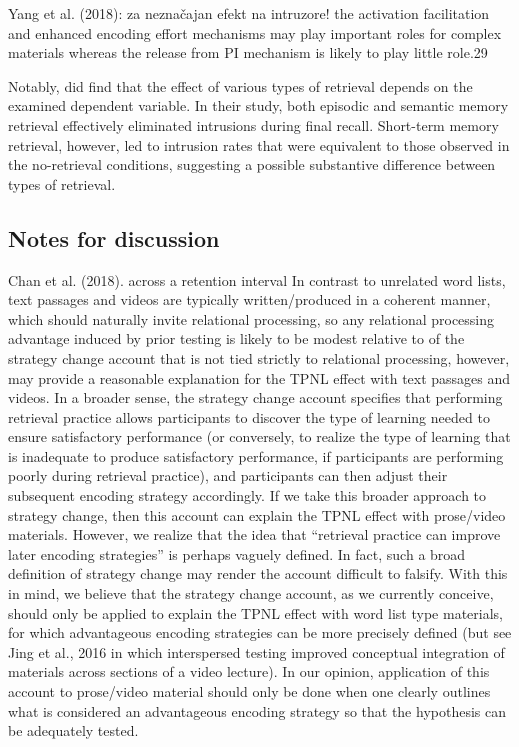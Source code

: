 \documentclass[../main.tex]{subfiles}
\begin{document}
Yang et al. (2018): za neznačajan efekt na intruzore!
the activation facilitation and enhanced encoding effort mechanisms may play
important roles for complex materials whereas the release from PI
mechanism is likely to play little role.29


Notably, \cite{pastotterRetrievalLearningFacilitates2011} did find that the effect
of various types of retrieval depends on the examined dependent variable. In their
study, both episodic and semantic memory retrieval effectively eliminated intrusions
during final recall. Short-term memory retrieval, however, led to intrusion rates 
that were equivalent to those observed in the no-retrieval conditions, suggesting
a possible substantive difference between types of retrieval.


\subsection{Notes for discussion}


Chan et al. (2018). across a retention interval
In contrast to unrelated word lists, text passages and videos are
typically written/produced in a coherent manner, which should naturally
invite relational processing, so any relational processing advantage
induced by prior testing is likely to be modest relative to
of the strategy change account that is not tied strictly to relational
processing, however, may provide a reasonable explanation for the
TPNL effect with text passages and videos. In a broader sense, the
strategy change account specifies that performing retrieval practice
allows participants to discover the type of learning needed to ensure
satisfactory performance (or conversely, to realize the type of learning
that is inadequate to produce satisfactory performance, if participants
are performing poorly during retrieval practice), and participants can
then adjust their subsequent encoding strategy accordingly. If we take
this broader approach to strategy change, then this account can explain
the TPNL effect with prose/video materials. However, we realize that
the idea that “retrieval practice can improve later encoding strategies”
is perhaps vaguely defined. In fact, such a broad definition of strategy
change may render the account difficult to falsify. With this in mind, we
believe that the strategy change account, as we currently conceive,
should only be applied to explain the TPNL effect with word list type
materials, for which advantageous encoding strategies can be more
precisely defined (but see Jing et al., 2016 in which interspersed testing
improved conceptual integration of materials across sections of a video
lecture). In our opinion, application of this account to prose/video
material should only be done when one clearly outlines what is considered
an advantageous encoding strategy so that the hypothesis can
be adequately tested.
\end{document}
